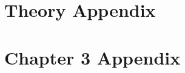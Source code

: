 \documentclass[12pt]{uthesis-v12}  %
\begin{document}
\chapter{Theory Appendix}

\chapter{Chapter 3 Appendix}
%




\end{document}
